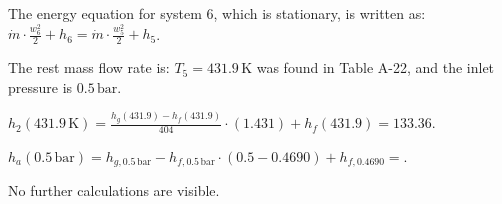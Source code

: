 The energy equation for system 6, which is stationary, is written as:  
\( \dot{m} \cdot \frac{w_6^2}{2} + h_6 = \dot{m} \cdot \frac{w_5^2}{2} + h_5 \).  

The rest mass flow rate is:  
\( T_5 = 431.9 \, \text{K} \) was found in Table A-22, and the inlet pressure is \( 0.5 \, \text{bar} \).  

\( h_2 (431.9 \, \text{K}) = \frac{h_{g}(431.9) - h_{f}(431.9)}{404} \cdot (1.431) + h_{f}(431.9) = 133.36 \).  

\( h_{a} (0.5 \, \text{bar}) = h_{g, 0.5 \, \text{bar}} - h_{f, 0.5 \, \text{bar}} \cdot (0.5 - 0.4690) + h_{f, 0.4690} = \).  

No further calculations are visible.